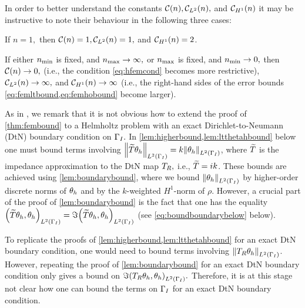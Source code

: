 In order to better understand the constants $\mathcal C(n), \mathcal C_{L^{2}}(n),$ and $\mathcal C_{H^{1}}(n)$ it may be instructive to note their behaviour in the following three cases:
\bit
\item If $n=1,$ then $\mathcal C(n)=1, \mathcal C_{L^{2}}(n)=1,$ and $\mathcal C_{H^{1}}(n)=2$.
\item If either $n_{\min}$ is fixed, and $n_{\max} \rightarrow \infty,$ or $n_{\max}$ is fixed, and $n_{\min} \rightarrow 0,$ then $\mathcal C(n)\rightarrow 0,$ (i.e., the condition \cref{eq:hfemcond} becomes more restrictive), $\mathcal C_{L^{2}}(n)\rightarrow \infty,$ and $\mathcal C_{H^{1}}(n)\rightarrow \infty$ (i.e., the right-hand sides of the error bounds \cref{eq:femltbound,eq:femhobound} become larger).
  \eit
  \ere

  As in \cite[Remark 5.3(e)]{DuWu:15}, we remark that it is not obvious how to extend the proof of \cref{thm:fembound} to a Helmholtz problem with an exact Dirichlet-to-Neumann (DtN) boundary condition on $\Gamma_{I}.$ In \cref{lem:higherbound,lem:ltthetahbound} below one must bound terms involving $\NLtGI{\DtNapprox\thetah} = k\NLtGI{\thetah}$, where $\widetilde{T}$ is the impedance approximation to the DtN map $T_{R},$ i.e., $\widetilde{T} = ik$. These bounds are achieved using \cref{lem:boundarybound}, where we bound $\NLtGI{\thetah}$ by higher-order discrete norms of $\theta_{h}$ and by the $k$-weighted $H^1$-norm of $\rho.$ However, a crucial part of the proof of \cref{lem:boundarybound} is the fact that one has the equality $\IPLtGI{\DtNapprox\thetah}{\thetah} = \Im \IPLtGI{\DtNapprox \thetah}{\thetah}$ (see \cref{eq:boundboundarybelow} below).

  To replicate the proofs of \cref{lem:higherbound,lem:ltthetahbound} for an exact DtN boundary condition, one would need to bound terms involving $\NLtGI{\DtN \thetah}$. However, repeating the proof of \cref{lem:boundarybound} for an exact DtN boundary condition only gives a bound on $\Im \IPLtGI{\DtN \thetah}{\thetah}.$ Therefore, it is at this stage not clear how one can bound the terms on $\Gamma_{I}$ for an exact DtN boundary condition.
  \ere

